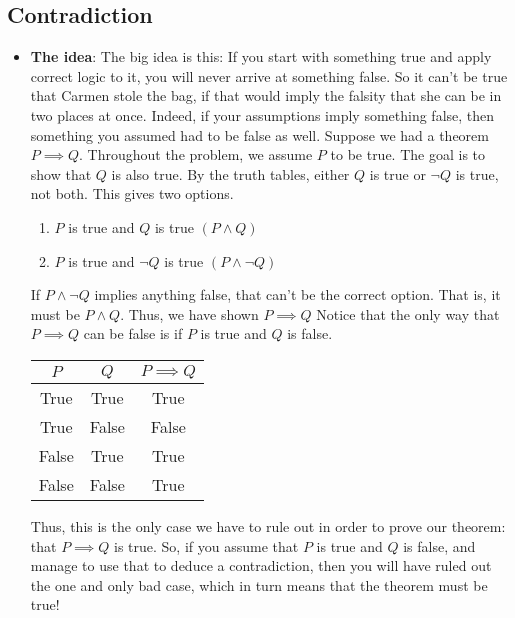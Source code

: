 \documentclass{report}
\begin{document}
    \subsection{Contradiction}
    \begin{itemize}
        \item \textbf{The idea}: The big idea is this: If you start with something true and apply correct logic to it, you will never arrive at something false. So it can’t be true that Carmen stole the bag, if that would imply the falsity that she can be in two places at once. Indeed, if your assumptions imply something false, then something you assumed had to be false as well.
            \bigbreak \noindent 
            Suppose we had a theorem $P \implies Q$. Throughout the problem, we assume $P$ to be true. The goal is to show that $Q$ is also true. By the truth tables, either $Q$ is true or $\neg Q$ is true, not both. This gives two options.
            \begin{enumerate}
                \item $P$ is true and $Q$ is true $(P \land Q) $
                \item $P$ is true and $\neg Q$ is true $(P \land \neg Q) $
            \end{enumerate}
            If $P \land \neg Q $ implies anything false, that can't be the correct option. That is, it must be $P \land Q$. Thus, we have shown $P\implies Q $
            \bigbreak \noindent 
            Notice that the only way that \(P \implies Q\) can be false is if \(P\) is true and \(Q\) is false.
            \bigbreak \noindent 
            \begin{center}
                \begin{tabular}{c|c|c}
                    $P$ &$Q$ &$P \implies  Q$ \\
                    \hline
                    True &True &True \\
                    True &False &False \\
                    False &True &True \\
                    False &False &True
                \end{tabular}
            \end{center}
            Thus, this is the only case we have to rule out in order to prove our theorem: that \(P \implies Q\) is true. So, if you assume that \(P\) is true and \(Q\) is false, and manage to use that to deduce a contradiction, then you will have ruled out the one and only bad case, which in turn means that the theorem must be true!

\end{itemize}
\end{document}
